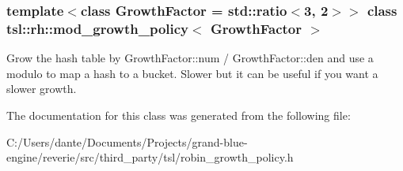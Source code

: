 \subsubsection*{template$<$class Growth\+Factor = std\+::ratio$<$3, 2$>$$>$\newline
class tsl\+::rh\+::mod\+\_\+growth\+\_\+policy$<$ Growth\+Factor $>$}

Grow the hash table by Growth\+Factor\+::num / Growth\+Factor\+::den and use a modulo to map a hash to a bucket. Slower but it can be useful if you want a slower growth. 

The documentation for this class was generated from the following file\+:\begin{DoxyCompactItemize}
\item 
C\+:/\+Users/dante/\+Documents/\+Projects/grand-\/blue-\/engine/reverie/src/third\+\_\+party/tsl/robin\+\_\+growth\+\_\+policy.\+h\end{DoxyCompactItemize}
